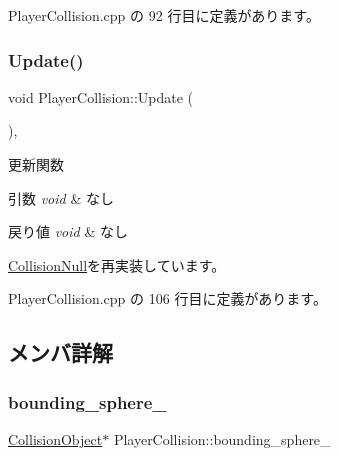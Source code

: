  Player\+Collision.\+cpp の 92 行目に定義があります。

\mbox{\label{class_player_collision_a09f97f220903f5724a3af6b97af3a336}} 
\subsubsection{\texorpdfstring{Update()}{Update()}}
{\footnotesize\ttfamily void Player\+Collision\+::\+Update (\begin{DoxyParamCaption}{ }\end{DoxyParamCaption})\hspace{0.3cm}{\ttfamily [override]}, {\ttfamily [virtual]}}



更新関数 


\begin{DoxyParams}{引数}
{\em void} & なし \\
\hline
\end{DoxyParams}

\begin{DoxyRetVals}{戻り値}
{\em void} & なし \\
\hline
\end{DoxyRetVals}


\mbox{\hyperlink{class_collision_null_ad6ac0e9b06fcb4e3d19a5c3c1cadfe7e}{Collision\+Null}}を再実装しています。



 Player\+Collision.\+cpp の 106 行目に定義があります。



\subsection{メンバ詳解}
\mbox{\label{class_player_collision_adf8368bcd0e09b6ddd8cb2756daf2d48}} 
\subsubsection{\texorpdfstring{bounding\+\_\+sphere\+\_\+}{bounding\_sphere\_}}
{\footnotesize\ttfamily \mbox{\hyperlink{class_collision_object}{Collision\+Object}}$\ast$ Player\+Collision\+::bounding\+\_\+sphere\+\_\+\hspace{0.3cm}{\ttfamily [private]}}



